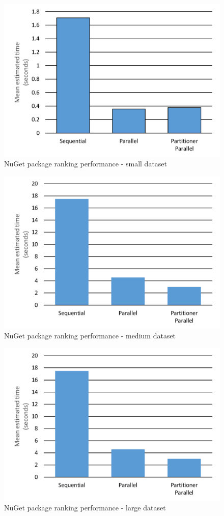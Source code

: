 \begin{figure}[htb]
\centering
\includegraphics[width=.8\linewidth]{figures04/NugetSmall.pdf}
\caption{NuGet package ranking performance - small dataset}
\label{fig: NugetPerfSmall}
\end{figure}

\begin{figure}[htb]
\centering
\includegraphics[width=.8\linewidth]{figures04/NugetMedium.pdf}
\caption{NuGet package ranking performance - medium dataset}
\label{fig: NugetPerfMed}
\end{figure}

\begin{figure}[htb]
\centering
\includegraphics[width=.8\linewidth]{figures04/NugetLarge.pdf}
\caption{NuGet package ranking performance - large dataset}
\label{fig: NugetPerfLarge}
\end{figure}


